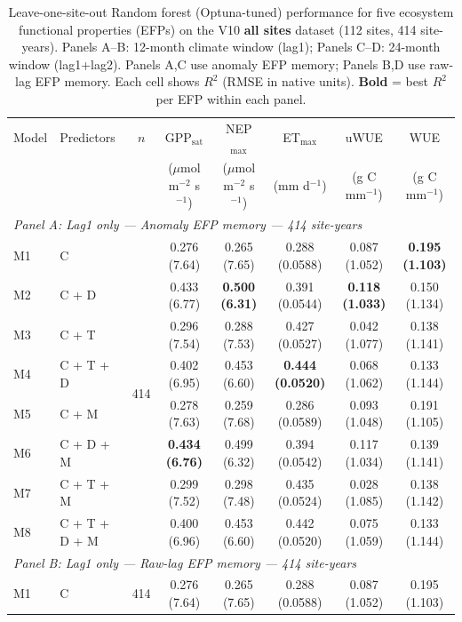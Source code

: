 \begin{table}[htbp]
\centering
\caption{Leave-one-site-out Random forest (Optuna-tuned) performance for five ecosystem functional properties (EFPs) on the V10 \textbf{all sites} dataset (112 sites, 414 site-years). Panels A--B: 12-month climate window (lag1); Panels C--D: 24-month window (lag1+lag2). Panels A,C use anomaly EFP memory; Panels B,D use raw-lag EFP memory. Each cell shows $R^2$ (RMSE in native units). \textbf{Bold} = best $R^2$ per EFP within each panel.}
\label{tab:RFoptuna_LOSO_v10_all_sites}
\footnotesize
\setlength{\tabcolsep}{4pt}
\begin{tabular}{llcccccc}
\toprule
Model & Predictors & $n$ & GPP$_\mathrm{sat}$ & NEP$_\mathrm{max}$ & ET$_\mathrm{max}$ & uWUE & WUE \\
  &  &  & ($\mu$mol m$^{-2}$ s$^{-1}$) & ($\mu$mol m$^{-2}$ s$^{-1}$) & (mm d$^{-1}$) & (g C mm$^{-1}$) & (g C mm$^{-1}$) \\
\midrule
\multicolumn{8}{l}{\textit{Panel A: Lag1 only --- Anomaly EFP memory --- 414 site-years}} \\
\midrule
M1 & C & \multirow{8}{*}{414} & 0.276 (7.64) & 0.265 (7.65) & 0.288 (0.0588) & 0.087 (1.052) & \textbf{0.195 (1.103)} \\
M2 & C + D &  & 0.433 (6.77) & \textbf{0.500 (6.31)} & 0.391 (0.0544) & \textbf{0.118 (1.033)} & 0.150 (1.134) \\
M3 & C + T &  & 0.296 (7.54) & 0.288 (7.53) & 0.427 (0.0527) & 0.042 (1.077) & 0.138 (1.141) \\
M4 & C + T + D &  & 0.402 (6.95) & 0.453 (6.60) & \textbf{0.444 (0.0520)} & 0.068 (1.062) & 0.133 (1.144) \\
M5 & C + M &  & 0.278 (7.63) & 0.259 (7.68) & 0.286 (0.0589) & 0.093 (1.048) & 0.191 (1.105) \\
M6 & C + D + M &  & \textbf{0.434 (6.76)} & 0.499 (6.32) & 0.394 (0.0542) & 0.117 (1.034) & 0.139 (1.141) \\
M7 & C + T + M &  & 0.299 (7.52) & 0.298 (7.48) & 0.435 (0.0524) & 0.028 (1.085) & 0.138 (1.142) \\
M8 & C + T + D + M &  & 0.400 (6.96) & 0.453 (6.60) & 0.442 (0.0520) & 0.075 (1.059) & 0.133 (1.144) \\
\midrule
\multicolumn{8}{l}{\textit{Panel B: Lag1 only --- Raw-lag EFP memory --- 414 site-years}} \\
\midrule
M1 & C & \multirow{8}{*}{414} & 0.276 (7.64) & 0.265 (7.65) & 0.288 (0.0588) & 0.087 (1.052) & 0.195 (1.103) \\

\end{tabular}
\end{table}
